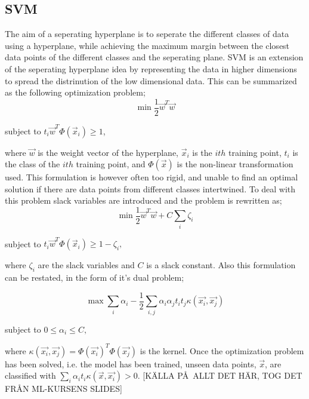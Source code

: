 \documentclass{article}
\begin{document}
\subsection{SVM}
The aim of a seperating hyperplane is to seperate the different classes of data using a hyperplane, while achieving the maximum margin between the closest data points of the different classes and the seperating plane. SVM is an extension of the seperating hyperplane idea by representing the data in higher dimensions to spread the distrinution of the low dimensional data. This can be summarized as the following optimization problem;
\begin{equation}
\min \frac{1}{2}\vec{w}^{T}\vec{w}
\end{equation} 
\begin{center}
 subject to  $t_i \vec{w}^{T} \Phi(\vec{x}_i)  \geq 1$,  \\
\end{center}
where $\vec{w}$ is the weight vector of the hyperplane, $\vec{x}_i$ is the $ith$ training point, $t_i$ is the class of the $ith$ training point, and $\Phi(\vec{x})$ is the non-linear transformation used. This formulation is however often too rigid, and unable to find an optimal solution if there are data points from different classes intertwined. To deal with this problem slack variables are introduced and the problem is rewritten as; 
\newpage
\begin{equation}
\min \frac{1}{2}\vec{w}^{T}\vec{w} + C\sum\limits_i \zeta_i 
\end{equation}
\begin{center}
subject to $t_i \vec{w}^{T} \Phi(\vec{x}_i)  \geq 1 - \zeta_i, $
\end{center}
where $\zeta_i$ are the slack variables and $C$ is a slack constant. Also this formulation can be restated, in the form of it's dual problem;

\begin{equation}
\max \sum\limits_i \alpha_i - \frac{1}{2}\sum\limits_{i,j} \alpha_i \alpha_j t_i t_j \kappa (\vec{x_i}, \vec{x_j}) 
\end{equation}
\begin{center}
subject to $0 \leq \alpha_i \leq C, $
\end{center}
where $\kappa (\vec{x_i}, \vec{x_j}) = \Phi(\vec{x_i})^T \Phi(\vec{x_j})$ is the kernel. Once the optimization problem has been solved, i.e. the model has been trained, unseen data points, $\vec{x}$,  are classified with $\sum\limits_i \alpha_i t_i \kappa(\vec{x},\vec{x_i}) > 0$. [K\"ALLA P\AA\ ALLT DET H\"AR, TOG DET FR\AA N ML-KURSENS SLIDES]
\end{document}
